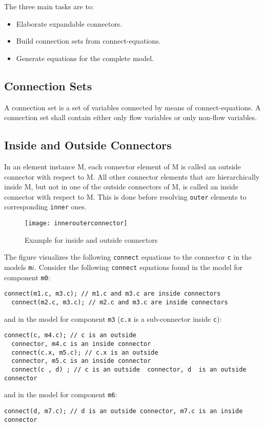 The three main tasks are to:
\begin{itemize}
\item
  Elaborate expandable connectors.
\item
  Build connection sets from connect-equations.
\item
  Generate equations for the complete model.
\end{itemize}

\subsection{Connection Sets}

A connection set is a set of variables connected by means of
connect-equations. A connection set shall contain either only flow
variables or only non-flow variables.

\subsection{Inside and Outside Connectors}

In an element instance M, each connector element of M is called an
outside connector with respect to M. All other connector elements that
are hierarchically inside M, but not in one of the outside connectors of
M, is called an inside connector with respect to M. This is done before
resolving \lstinline!outer! elements to corresponding \lstinline!inner! ones.

\begin{example}
\begin{figure}[H]
\texttt{[image: innerouterconnector]}
\caption{Example for inside and outside connectors}
\end{figure}
The figure visualizes the following \lstinline!connect! equations to
the connector \lstinline!c! in the models \lstinline!m!$i$. Consider the
following \lstinline!connect! equations found in the model for component \lstinline!m0!:
\begin{lstlisting}[language=modelica]
  connect(m1.c, m3.c); // m1.c and m3.c are inside connectors
  connect(m2.c, m3.c); // m2.c and m3.c are inside connectors
\end{lstlisting}
and in the model for component \lstinline!m3! (\lstinline!c.x! is a sub-connector inside
\lstinline!c!):
\begin{lstlisting}[language=modelica]
  connect(c, m4.c); // c is an outside
  connector, m4.c is an inside connector
  connect(c.x, m5.c); // c.x is an outside
  connector, m5.c is an inside connector
  connect(c , d) ; // c is an outside  connector, d  is an outside connector
\end{lstlisting}
and in the model for component \lstinline!m6!:
\begin{lstlisting}[language=modelica]
  connect(d, m7.c); // d is an outside connector, m7.c is an inside connector
\end{lstlisting}
\end{example}

